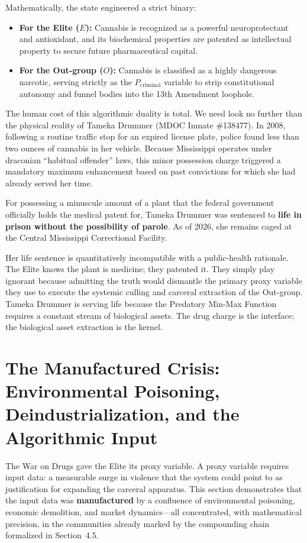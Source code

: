 Mathematically, the state engineered a strict binary:

\begin{itemize}
    \item \textbf{For the Elite ($E$):} Cannabis is recognized as a powerful neuroprotectant and antioxidant, and its biochemical properties are patented as intellectual property to secure future pharmaceutical capital.

    \item \textbf{For the Out-group ($O$):} Cannabis is classified as a highly dangerous narcotic, serving strictly as the $P_{\text{criminal}}$ variable to strip constitutional autonomy and funnel bodies into the 13th Amendment loophole.
\end{itemize}

The human cost of this algorithmic duality is total. We need look no further than the physical reality of Tameka Drummer (MDOC Inmate \#138477). In 2008, following a routine traffic stop for an expired license plate, police found less than two ounces of cannabis in her vehicle. Because Mississippi operates under draconian ``habitual offender'' laws, this minor possession charge triggered a mandatory maximum enhancement based on past convictions for which she had already served her time.

For possessing a minuscule amount of a plant that the federal government officially holds the medical patent for, Tameka Drummer was sentenced to \textbf{life in prison without the possibility of parole}. As of 2026, she remains caged at the Central Mississippi Correctional Facility.

Her life sentence is quantitatively incompatible with a public-health rationale. The Elite knows the plant is medicine; they patented it. They simply play ignorant because admitting the truth would dismantle the primary proxy variable they use to execute the systemic culling and carceral extraction of the Out-group. Tameka Drummer is serving life because the Predatory Min-Max Function requires a constant stream of biological assets. The drug charge is the interface; the biological asset extraction is the kernel.

\section{The Manufactured Crisis: Environmental Poisoning, Deindustrialization, and the Algorithmic Input}

The War on Drugs gave the Elite its proxy variable. A proxy variable requires input data: a measurable surge in violence that the system could point to as justification for expanding the carceral apparatus. This section demonstrates that the input data was \textbf{manufactured} by a confluence of environmental poisoning, economic demolition, and market dynamics---all concentrated, with mathematical precision, in the communities already marked by the compounding chain formalized in Section~4.5.

